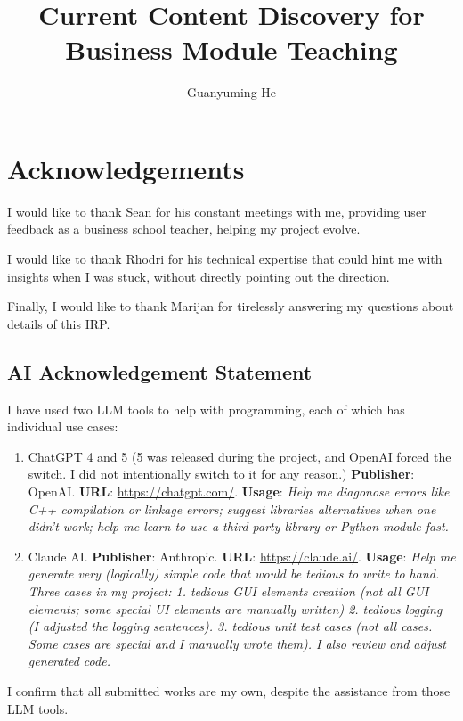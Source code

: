 \documentclass[final-report]{report-template}
\title{Current Content Discovery for Business Module Teaching}
\author{Guanyuming He}
\begin{document}
\maketitlepage  

\section*{Acknowledgements}
I would like to thank Sean for his constant meetings with me, providing user
feedback as a business school teacher, helping my project evolve.

I would like to thank Rhodri for his technical expertise that could hint me
with insights when I was stuck, without directly pointing out the direction.

Finally, I would like to thank Marijan for tirelessly answering my questions
about details of this IRP.

\subsection*{AI Acknowledgement Statement}
I have used two LLM tools to help with programming, each of which has
individual use cases:
\begin{enumerate}
	\item ChatGPT 4 and 5 (5 was released during the project, and OpenAI forced
		the switch. I did not intentionally switch to it for any reason.)
		\textbf{Publisher}: OpenAI. \textbf{URL}: \url{https://chatgpt.com/}.
		\textbf{Usage}: \emph{Help me diagonose errors like C++ compilation or
		linkage errors; suggest libraries alternatives when one didn't work;
	help me learn to use a third-party library or Python module fast.}
	\item Claude AI. \textbf{Publisher}: Anthropic. \textbf{URL}:
		\url{https://claude.ai/}.  \textbf{Usage}: \emph{Help me generate very
			(logically) simple code that would be tedious to write to hand.
			Three cases in my project: 1. tedious GUI elements creation (not
			all GUI elements; some special UI elements are manually written) 2.
			tedious logging (I adjusted the logging sentences).  3. tedious
			unit test cases (not all cases. Some cases are special and I
			manually wrote them). I also review and adjust generated code.}
\end{enumerate}

I confirm that all submitted works are my own, despite the assistance from those
LLM tools.
\end{document}
